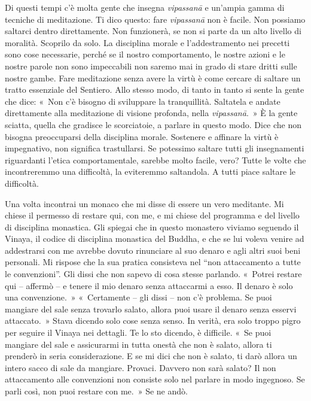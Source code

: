 Di questi tempi c'è molta gente che insegna \emph{vipassanā} e un'ampia
gamma di tecniche di meditazione. Ti dico questo: fare \emph{vipassanā}
non è facile. Non possiamo saltarci dentro direttamente. Non funzionerà,
se non si parte da un alto livello di moralità. Scoprilo da solo. La
disciplina morale e l'addestramento nei precetti sono cose necessarie,
perché se il nostro comportamento, le nostre azioni e le nostre parole
non sono impeccabili non saremo mai in grado di stare dritti sulle
nostre gambe. Fare meditazione senza avere la virtù è come cercare di
saltare un tratto essenziale del Sentiero. Allo stesso modo, di tanto in
tanto si sente la gente che dice: «~Non c'è bisogno di sviluppare la
tranquillità. Saltatela e andate direttamente alla meditazione di
visione profonda, nella \emph{vipassanā}.~» È la gente sciatta, quella
che gradisce le scorciatoie, a parlare in questo modo. Dice che non
bisogna preoccuparsi della disciplina morale. Sostenere e affinare la
virtù è impegnativo, non significa trastullarsi. Se potessimo saltare
tutti gli insegnamenti riguardanti l'etica comportamentale, sarebbe
molto facile, vero? Tutte le volte che incontreremmo una difficoltà, la
eviteremmo saltandola. A tutti piace saltare le difficoltà.

Una volta incontrai un monaco che mi disse di essere un vero meditante.
Mi chiese il permesso di restare qui, con me, e mi chiese del programma
e del livello di disciplina monastica. Gli spiegai che in questo
monastero viviamo seguendo il Vinaya, il codice di disciplina monastica
del Buddha, e che se lui voleva venire ad addestrarsi con me avrebbe
dovuto rinunciare al suo denaro e agli altri suoi beni personali. Mi
rispose che la sua pratica consisteva nel ``non attaccamento a tutte le
convenzioni''. Gli dissi che non sapevo di cosa stesse parlando.
«~Potrei restare qui -- affermò -- e tenere il mio denaro senza
attaccarmi a esso. Il denaro è solo una convenzione.~» «~Certamente --
gli dissi -- non c'è problema. Se puoi mangiare del sale senza trovarlo
salato, allora puoi usare il denaro senza esservi attaccato.~» Stava
dicendo solo cose senza senso. In verità, era solo troppo pigro per
seguire il Vinaya nei dettagli. Te lo sto dicendo, è difficile. «~Se
puoi mangiare del sale e assicurarmi in tutta onestà che non è salato,
allora ti prenderò in seria considerazione. E se mi dici che non è
salato, ti darò allora un intero sacco di sale da mangiare. Provaci.
Davvero non sarà salato? Il non attaccamento alle convenzioni non
consiste solo nel parlare in modo ingegnoso. Se parli così, non puoi
restare con me.~» Se ne andò.

